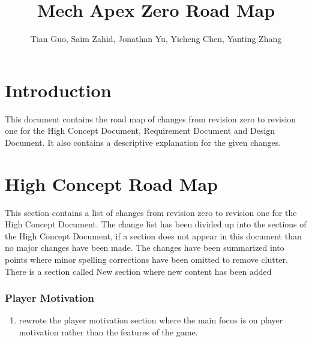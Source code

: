 \documentclass[]{article}
\title{Mech Apex Zero Road Map}
\author{Tian Guo, Saim Zahid, Jonathan Yu, Yicheng Chen, Yanting Zhang }
\begin{document}
\maketitle
\section*{Introduction}
This document contains the road map of changes from revision zero to revision one for the High Concept Document, Requirement Document and Design Document. It also  contains a descriptive  explanation for the given changes.
\section*{High Concept Road Map}
This section contains a list of changes from revision zero to revision one for the High Concept Document. The change list has been divided up into the sections of the High Concept Document, if a section does not appear in this document than no major changes have been made. The changes have been summarized into points where minor spelling corrections have been omitted to remove clutter. There is a section called New section where new content has been added
\subsubsection*{Player Motivation}
\begin{enumerate}
	\item rewrote the player motivation section where the main focus is on player motivation rather than the features of the game. 
\end{enumerate}
\end{document}
